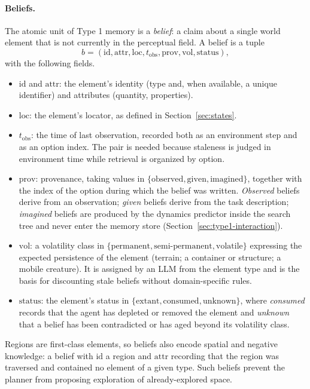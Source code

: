 \documentclass[11pt]{article}
\newcommand{\loc}{\mathrm{loc}}
\newcommand{\prov}{\mathrm{prov}}
\newcommand{\vol}{\mathrm{vol}}
\newcommand{\stat}{\mathrm{status}}
\newcommand{\attr}{\mathrm{attr}}
\newcommand{\id}{\mathrm{id}}
\begin{document}
\paragraph{Beliefs.}
The atomic unit of Type 1 memory is a \emph{belief}: a claim about a single world element that is not currently in the perceptual field. A belief is a tuple
\begin{equation}
b=(\id,\attr,\loc,t_{\mathrm{obs}},\prov,\vol,\stat),
\label{eq:belief}
\end{equation}
with the following fields.
\begin{itemize}[leftmargin=1.5em,itemsep=1pt]
\item $\id$ and $\attr$: the element's identity (type and, when available, a unique identifier) and attributes (quantity, properties).
\item $\loc$: the element's locator, as defined in Section~\ref{sec:states}.
\item $t_{\mathrm{obs}}$: the time of last observation, recorded both as an environment step and as an option index. The pair is needed because staleness is judged in environment time while retrieval is organized by option.
\item $\prov$: provenance, taking values in $\{\mathrm{observed},\mathrm{given},\mathrm{imagined}\}$, together with the index of the option during which the belief was written. \emph{Observed} beliefs derive from an observation; \emph{given} beliefs derive from the task description; \emph{imagined} beliefs are produced by the dynamics predictor inside the search tree and never enter the memory store (Section~\ref{sec:type1-interaction}).
\item $\vol$: a volatility class in $\{\mathrm{permanent},\mathrm{semi\text{-}permanent},\mathrm{volatile}\}$ expressing the expected persistence of the element (terrain; a container or structure; a mobile creature). It is assigned by an LLM from the element type and is the basis for discounting stale beliefs without domain-specific rules.
\item $\stat$: the element's status in $\{\mathrm{extant},\mathrm{consumed},\mathrm{unknown}\}$, where \emph{consumed} records that the agent has depleted or removed the element and \emph{unknown} that a belief has been contradicted or has aged beyond its volatility class.
\end{itemize}
Regions are first-class elements, so beliefs also encode spatial and negative knowledge: a belief with $\id$ a region and $\attr$ recording that the region was traversed and contained no element of a given type. Such beliefs prevent the planner from proposing exploration of already-explored space.
\end{document}
